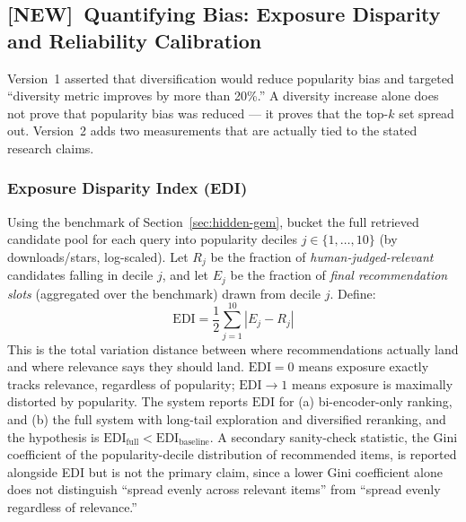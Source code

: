 \documentclass[11pt]{article}
\newcommand{\newtag}{\textcolor{accent}{\textbf{[NEW]}}\ }
\begin{document}
\subsection{\newtag Quantifying Bias: Exposure Disparity and Reliability Calibration}
\label{sec:bias-calibration}
Version~1 asserted that diversification would reduce popularity bias and targeted ``diversity metric
improves by more than 20\%.'' A diversity increase alone does not prove that popularity bias was reduced
--- it proves that the top-$k$ set spread out. Version~2 adds two measurements that are actually tied to
the stated research claims.

\subsubsection{Exposure Disparity Index (EDI)}
Using the benchmark of Section~\ref{sec:hidden-gem}, bucket the full retrieved candidate pool for each
query into popularity deciles $j \in \{1,\dots,10\}$ (by downloads/stars, log-scaled). Let
$R_j$ be the fraction of \emph{human-judged-relevant} candidates falling in decile $j$, and let $E_j$ be
the fraction of \emph{final recommendation slots} (aggregated over the benchmark) drawn from decile $j$.
Define:
\begin{equation}
\mathrm{EDI} = \frac{1}{2}\sum_{j=1}^{10} \left| E_j - R_j \right|
\end{equation}
This is the total variation distance between where recommendations actually land and where relevance says
they should land. $\mathrm{EDI} = 0$ means exposure exactly tracks relevance, regardless of popularity;
$\mathrm{EDI} \to 1$ means exposure is maximally distorted by popularity. The system reports
$\mathrm{EDI}$ for (a) bi-encoder-only ranking, and (b) the full system with long-tail exploration and
diversified reranking, and the hypothesis is $\mathrm{EDI}_{\text{full}} < \mathrm{EDI}_{\text{baseline}}$.
A secondary sanity-check statistic, the Gini coefficient of the popularity-decile distribution of
recommended items, is reported alongside EDI but is not the primary claim, since a lower Gini coefficient
alone does not distinguish ``spread evenly across relevant items'' from ``spread evenly regardless of
relevance.''
\end{document}
